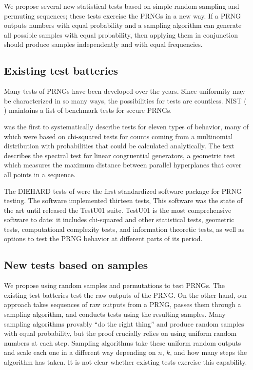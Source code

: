 \documentclass[12pt]{article}
\newcommand{\todo}[1]{{\color{red}{TO DO: \sc #1}}}
\begin{document}
We propose several new statistical tests based on simple random sampling and permuting sequences;
these tests exercise the PRNGs in a new way.
If a PRNG outputs numbers with equal probability and a sampling algorithm can generate all possible samples with equal probability, then applying them in conjunction should produce samples independently and with equal frequencies.

\subsection{Existing test batteries}

Many tests of PRNGs have been developed over the years.
Since uniformity may be characterized in so many ways, the possibilities for tests are countless.
NIST (\cite{soto_statistical_1999, rukhin_statistical_2010} ) maintains a list of benchmark tests for secure PRNGs.

\citet{knuth_art_1997} was the first to systematically describe tests for eleven types of behavior, many of which were based on chi-squared tests for counts coming from a multinomial distribution with probabilities that could be calculated analytically.
The text describes the spectral test for linear congruential generators, a geometric test which measures the maximum distance between parallel hyperplanes that cover all points in a sequence.

The DIEHARD tests of \citet{marsaglia_diehard_1995} were the first standardized software package for PRNG testing.
The software implemented thirteen tests, \todo{discuss them}
This software was the state of the art until \citet{lecuyer_testu01_2007} released the TestU01 suite.
TestU01 is the most comprehensive software to date:
it includes chi-squared and other statistical tests, geometric tests, computational complexity tests, and information theoretic tests, as well as options to test the PRNG behavior at different parts of its period.

\subsection{New tests based on samples}

We propose using random samples and permutations to test PRNGs.
The existing test batteries test the raw outputs of the PRNG.
On the other hand, our approach takes sequences of raw outputs from a PRNG, passes them through a sampling algorithm, and conducts tests using the resulting samples.
Many sampling algorithms provably ``do the right thing'' and produce random samples with equal probability, but the proof crucially relies on using uniform random numbers at each step.
Sampling algorithms take these uniform random outputs and scale each one in a different way depending on $n$, $k$, and how many steps the algorithm has taken.
It is not clear whether existing tests exercise this capability.
\end{document}
